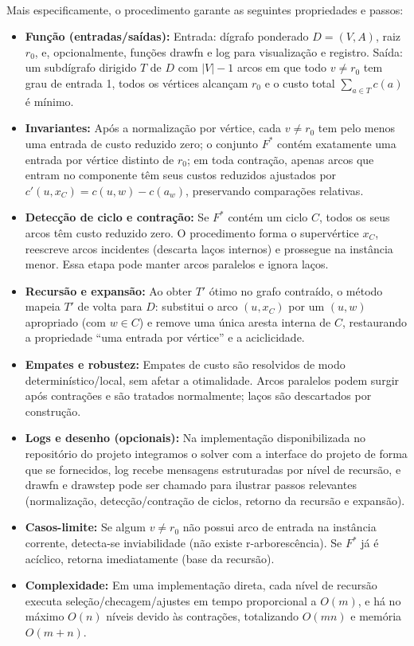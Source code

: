 \documentclass[12pt,a4paper]{article}
\def\texttt#1{#1}%
\def\emph#1{#1}%
\def\_{}%
\begin{document}
\paragraph{}
Mais especificamente, o procedimento garante as seguintes propriedades e passos:
\begin{itemize}\setlength{\itemsep}{2pt}
    \item \textbf{Função (entradas/saídas):} Entrada: dígrafo ponderado \(D=(V,A)\), raiz \(r_0\), e, opcionalmente, funções \texttt{draw\_fn} e \texttt{log} para visualização e registro. Saída: um subdígrafo dirigido \(T\) de \(D\) com \(|V|-1\) arcos em que todo \(v\neq r_0\) tem grau de entrada 1, todos os vértices alcançam \(r_0\) e o custo total \(\sum_{a\in T} c(a)\) é mínimo.
    \item \textbf{Invariantes:} Após a normalização por vértice, cada \(v\neq r_0\) tem pelo menos uma entrada de custo reduzido zero; o conjunto \(F^*\) contém exatamente uma entrada por vértice distinto de \(r_0\); em toda contração, apenas arcos que \emph{entram} no componente têm seus custos reduzidos ajustados por \(c'(u,x_C)=c(u,w)-c(a_w)\), preservando comparações relativas.
    \item \textbf{Detecção de ciclo e contração:} Se \(F^*\) contém um ciclo \(C\), todos os seus arcos têm custo reduzido zero. O procedimento forma o supervértice \(x_C\), reescreve arcos incidentes (descarta laços internos) e prossegue na instância menor. Essa etapa pode manter arcos paralelos e ignora laços.
    \item \textbf{Recursão e expansão:} Ao obter \(T'\) ótimo no grafo contraído, o método mapeia \(T'\) de volta para \(D\): substitui o arco \((u,x_C)\) por um \((u,w)\) apropriado (com \(w\in C\)) e remove uma única aresta interna de \(C\), restaurando a propriedade “uma entrada por vértice” e a aciclicidade.
    \item \textbf{Empates e robustez:} Empates de custo são resolvidos de modo determinístico/local, sem afetar a otimalidade. Arcos paralelos podem surgir após contrações e são tratados normalmente; laços são descartados por construção.
    \item \textbf{Logs e desenho (opcionais):} Na implementação disponibilizada no repositório do projeto integramos o solver com a interface do projeto de forma que se fornecidos, \texttt{log} recebe mensagens estruturadas por nível de recursão, e \texttt{draw\_fn} e \texttt{draw\_step} pode ser chamado para ilustrar passos relevantes (normalização, detecção/contração de ciclos, retorno da recursão e expansão).
    \item \textbf{Casos-limite:} Se algum \(v\neq r_0\) não possui arco de entrada na instância corrente, detecta-se inviabilidade (não existe r-arborescência). Se \(F^*\) já é acíclico, retorna imediatamente (base da recursão).
    \item \textbf{Complexidade:} Em uma implementação direta, cada nível de recursão executa seleção/checagem/ajustes em tempo proporcional a \(O(m)\), e há no máximo \(O(n)\) níveis devido às contrações, totalizando \(O(mn)\) e memória \(O(m+n)\).
\end{itemize}
\end{document}
